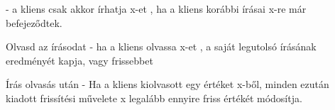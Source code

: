 \documentclass[twoside, a4paper, 12pt]{article}
\begin{document}
\begin{description}
                                                                        - a kliens csak akkor írhatja x-et , ha a kliens korábbi írásai x-re már befejeződtek.
                                                                    \item Olvasd az írásodat
                                                                        - ha a kliens olvassa x-et , a saját legutolsó írásának eredményét kapja, vagy frissebbet
                                                                    \item Írás olvasás után
                                                                        - Ha a kliens kiolvasott egy értéket x-ből, minden ezután kiadott frissítési művelete x legalább ennyire friss értékét módosítja.
                                                                \end{description}
                                                                
\end{document}

